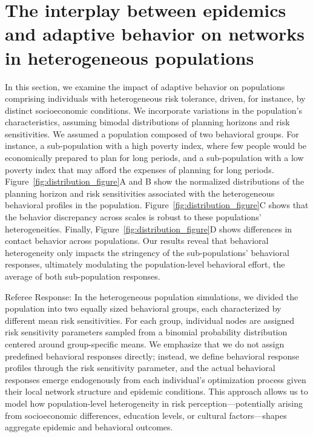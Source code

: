 \documentclass[9pt,twocolumn,twoside]{pnas-new}
\newcommand{\green}[1]{{\textcolor{green!50!black}{#1}}}
\begin{document}
\section*{The interplay between epidemics and adaptive behavior on networks in heterogeneous populations}
%
In this section, we examine the impact of adaptive behavior on populations comprising individuals with heterogeneous risk tolerance, driven, for instance, by distinct socioeconomic conditions.
%
%
We incorporate variations in the population's characteristics, assuming bimodal distributions of planning horizons and risk sensitivities.
%
We assumed a population composed of two behavioral groups. For instance, a sub-population with a high poverty index, where few people would be economically prepared to plan for long periods, and a sub-population with a low poverty index that may afford the expenses of planning for long periods.
%
Figure~\ref{fig:distribution_figure}A and B show the normalized distributions of the planning horizon and risk sensitivities associated with the heterogeneous behavioral profiles in the population.
Figure~\ref{fig:distribution_figure}C shows that the behavior discrepancy across scales is robust to these populations' heterogeneities.
Finally, Figure~\ref{fig:distribution_figure}D shows differences in contact behavior across populations. Our results reveal that behavioral heterogeneity only impacts the stringency of the sub-populations' behavioral responses, ultimately modulating the population-level behavioral effort, the average of both sub-population responses.

\green{Referee Response: In the heterogeneous population simulations, we divided the population into two equally sized behavioral groups, each characterized by different mean risk sensitivities. For each group, individual nodes are assigned risk sensitivity parameters sampled from a binomial probability distribution centered around group-specific means. We emphasize that we do not assign predefined behavioral responses directly; instead, we define behavioral response profiles through the risk sensitivity parameter, and the actual behavioral responses emerge endogenously from each individual's optimization process given their local network structure and epidemic conditions. This approach allows us to model how population-level heterogeneity in risk perception—potentially arising from socioeconomic differences, education levels, or cultural factors—shapes aggregate epidemic and behavioral outcomes.}
\end{document}
